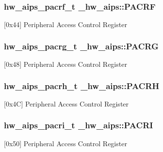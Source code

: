 \subsubsection[{\texorpdfstring{P\+A\+C\+RF}{PACRF}}]{ {\bf hw\+\_\+aips\+\_\+pacrf\+\_\+t} \+\_\+hw\+\_\+aips\+::\+P\+A\+C\+RF}\hypertarget{struct__hw__aips_a26716b32f083d1abe3809e7a548fdb55}{}\label{struct__hw__aips_a26716b32f083d1abe3809e7a548fdb55}
\mbox{[}0x44\mbox{]} Peripheral Access Control Register 
\subsubsection[{\texorpdfstring{P\+A\+C\+RG}{PACRG}}]{ {\bf hw\+\_\+aips\+\_\+pacrg\+\_\+t} \+\_\+hw\+\_\+aips\+::\+P\+A\+C\+RG}\hypertarget{struct__hw__aips_ab729b12f7b190d786d6e253d6782682b}{}\label{struct__hw__aips_ab729b12f7b190d786d6e253d6782682b}
\mbox{[}0x48\mbox{]} Peripheral Access Control Register 
\subsubsection[{\texorpdfstring{P\+A\+C\+RH}{PACRH}}]{ {\bf hw\+\_\+aips\+\_\+pacrh\+\_\+t} \+\_\+hw\+\_\+aips\+::\+P\+A\+C\+RH}\hypertarget{struct__hw__aips_a177db7d97603009a74d7e852d01543df}{}\label{struct__hw__aips_a177db7d97603009a74d7e852d01543df}
\mbox{[}0x4C\mbox{]} Peripheral Access Control Register 
\subsubsection[{\texorpdfstring{P\+A\+C\+RI}{PACRI}}]{ {\bf hw\+\_\+aips\+\_\+pacri\+\_\+t} \+\_\+hw\+\_\+aips\+::\+P\+A\+C\+RI}\hypertarget{struct__hw__aips_a4b8eb1a40e16fa6733be0f20ba4999b2}{}\label{struct__hw__aips_a4b8eb1a40e16fa6733be0f20ba4999b2}
\mbox{[}0x50\mbox{]} Peripheral Access Control Register 
